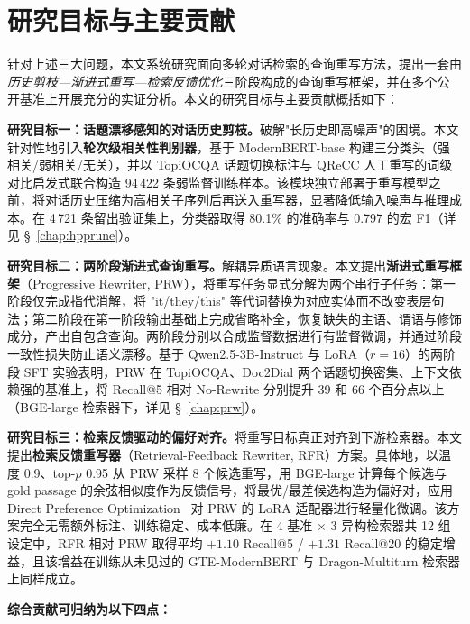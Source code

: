 \section{研究目标与主要贡献}

针对上述三大问题，本文系统研究面向多轮对话检索的查询重写方法，提出一套由\textit{历史剪枝—渐进式重写—检索反馈优化}三阶段构成的查询重写框架，并在多个公开基准上开展充分的实证分析。本文的研究目标与主要贡献概括如下：

\textbf{研究目标一：话题漂移感知的对话历史剪枝。}破解"长历史即高噪声"的困境。本文针对性地引入\textbf{轮次级相关性判别器}，基于 ModernBERT-base 构建三分类头（强相关/弱相关/无关），并以 TopiOCQA 话题切换标注与 QReCC 人工重写的词级对比启发式联合构造 94\,422 条弱监督训练样本。该模块独立部署于重写模型之前，将对话历史压缩为高相关子序列后再送入重写器，显著降低输入噪声与推理成本。在 4\,721 条留出验证集上，分类器取得 80.1\% 的准确率与 0.797 的宏 F1（详见 §~\ref{chap:hpprune}）。

\textbf{研究目标二：两阶段渐进式查询重写。}解耦异质语言现象。本文提出\textbf{渐进式重写框架}（Progressive Rewriter, PRW），将重写任务显式分解为两个串行子任务：第一阶段仅完成指代消解，将 "it/they/this" 等代词替换为对应实体而不改变表层句法；第二阶段在第一阶段输出基础上完成省略补全，恢复缺失的主语、谓语与修饰成分，产出自包含查询。两阶段分别以合成监督数据进行有监督微调，并通过阶段一致性损失防止语义漂移。基于 Qwen2.5-3B-Instruct 与 LoRA（$r{=}16$）的两阶段 SFT 实验表明，PRW 在 TopiOCQA、Doc2Dial 两个话题切换密集、上下文依赖强的基准上，将 Recall@5 相对 No-Rewrite 分别提升 39 和 66 个百分点以上（BGE-large 检索器下，详见 §~\ref{chap:prw}）。

\textbf{研究目标三：检索反馈驱动的偏好对齐。}将重写目标真正对齐到下游检索器。本文提出\textbf{检索反馈重写器}（Retrieval-Feedback Rewriter, RFR）方案。具体地，以温度 0.9、top-$p$ 0.95 从 PRW 采样 8 个候选重写，用 BGE-large 计算每个候选与 gold passage 的余弦相似度作为反馈信号，将最优/最差候选构造为偏好对，应用 Direct Preference Optimization~\citep{rafailov2023direct} 对 PRW 的 LoRA 适配器进行轻量化微调。该方案完全无需额外标注、训练稳定、成本低廉。在 4 基准 $\times$ 3 异构检索器共 12 组设定中，RFR 相对 PRW 取得平均 $+1.10$ Recall@5 / $+1.31$ Recall@20 的稳定增益，且该增益在训练从未见过的 GTE-ModernBERT 与 Dragon-Multiturn 检索器上同样成立。

\textbf{综合贡献可归纳为以下四点：}

